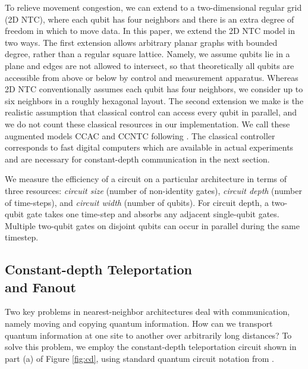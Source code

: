To relieve movement congestion,
we can extend to a two-dimensional regular grid
(2D NTC), where each
qubit has four neighbors and there is an extra degree of freedom
in which to move data.
In this paper, we extend the \textsc{2D NTC} model in two ways.
The first extension allows arbitrary planar graphs
with bounded degree, rather than a regular square lattice.
Namely, we assume qubits lie in a plane and edges are not allowed to intersect,
so that theoretically all qubits are accessible from above
or below by control and measurement apparatus.
Whereas 2D NTC conventionally assumes each qubit
has four neighbors, we consider up to six neighbors in a roughly hexagonal
layout. The second extension we make is the realistic assumption
that classical control can
access every qubit in parallel, and we do not count these classical
resources in our implementation. We call these augmented models
\textsc{CCAC} and \textsc{CCNTC} following 
\cite{Rosenbaum2012}. The classical controller
corresponds to fast digital computers which are
available in actual experiments and are necessary for constant-depth
communication in the next section.

We measure the efficiency of a circuit on a particular
architecture in terms of three resources:
\emph{circuit size} (number of non-identity gates),
\emph{circuit depth} (number of time-steps), and
\emph{circuit width} (number of qubits).
For circuit depth, a two-qubit gate takes
one time-step and absorbs any adjacent single-qubit gates.
Multiple two-qubit gates on disjoint qubits
can occur in parallel during the same timestep.

\subsection{Constant-depth Teleportation\\ and Fanout}
\label{subsec:fanout}

Two key problems in nearest-neighbor architectures deal with communication,
namely moving and copying quantum information.
How can we transport quantum information at one site to another over
arbitrarily long distances?
To solve this problem, we employ the constant-depth teleportation circuit
shown in part (a) of Figure \ref{fig:cd}, using standard quantum circuit
notation from \cite{Nielsen2000}.

